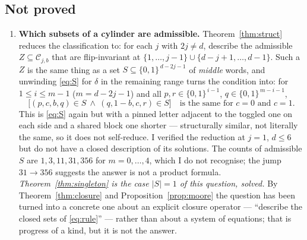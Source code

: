 \documentclass[11pt]{article}
\theoremstyle{definition}
\theoremstyle{remark}
\newcommand{\Cset}{\mathcal{C}}
\newcommand{\cube}{\{0,1\}}
\begin{document}
\subsection*{Not proved}
\begin{enumerate}
\item[(H2a)] \textbf{Which subsets of a cylinder are admissible.}  Theorem~\ref{thm:struct}
  reduces the classification to: for each $j$ with $2j\ne d$, describe the admissible
  $Z\subseteq\Cset_{j,b}$ that are flip-invariant at $\{1,\dots,j-1\}\cup\{d-j+1,\dots,d-1\}$.
  Such a $Z$ is the same thing as a set $S\subseteq\cube^{\,d-2j-1}$ of \emph{middle} words, and
  unwinding \eqref{eq:S} for $\delta$ in the remaining range turns the condition into: for
  $1\le i\le m-1$ ($m=d-2j-1$) and all $p,r\in\cube^{\,i-1}$, $q\in\cube^{\,m-i-1}$,
  \[
     \bigl[(p,c,b,q)\in S\ \wedge\ (q,1-b,c,r)\in S\bigr]\quad
     \text{is the same for }c=0\text{ and }c=1 .
  \]
  This is \eqref{eq:S} again but with a pinned letter adjacent to the toggled one on each side
  and a shared block one shorter --- structurally similar, not literally the same, so it does
  not self-reduce.  I verified the reduction at $j=1$, $d\le6$ but do not have a closed
  description of its solutions.  The counts of admissible $S$ are $1,3,11,31,356$ for
  $m=0,\dots,4$, which I do not recognise; the jump $31\to356$ suggests the answer is not a
  product formula.  \emph{Theorem~\ref{thm:singleton} is the case $|S|=1$ of this question,
  solved.}  By Theorem~\ref{thm:closure} and Proposition~\ref{prop:moore} the question has been
  turned into a concrete one about an explicit closure operator --- ``describe the closed sets
  of \eqref{eq:rule}'' --- rather than about a system of equations; that is progress of a kind,
  but it is not the answer.


\end{enumerate}
\end{document}
